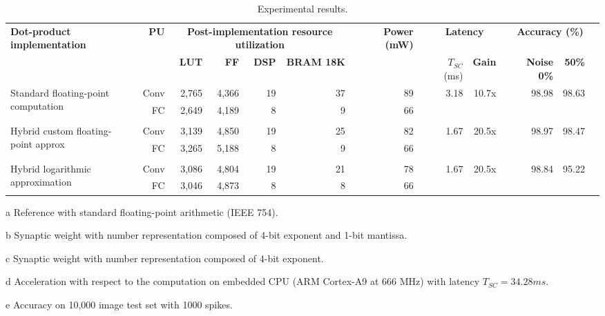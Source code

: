 \begin{table}[!t]
	\begin{threeparttable}
		\centering
		\caption{Experimental results.}\label{tab:results}
		\scriptsize
		\begin{tabular}{lrrrrrrrrrrrrrr}\toprule
			\multirow{2}{*}{\textbf{Dot-product implementation}} &\multirow{2}{*}{\textbf{PU}} &\multicolumn{4}{c}{\textbf{Post-implementation resource utilization}} & &\multirow{2}{*}{\textbf{Power (mW)}} & &\multicolumn{2}{c}{\textbf{Latency}} & &\multicolumn{2}{c}{\textbf{Accuracy (\%)\tnote{e}}} \\\cmidrule{3-6}\cmidrule{10-11}\cmidrule{13-14}
			& &\textbf{LUT} &\textbf{FF} &\textbf{DSP} &\textbf{BRAM 18K} & & & &$T_{SC}$ (ms) &\textbf{Gain\tnote{d}} & &\textbf{Noise 0\%} &\textbf{50\%} \\\midrule
			\multirow{2}{*}{Standard floating-point computation\tnote{a}} &Conv &2,765 &4,366 &19 &37 & &89 & &\multirow{2}{*}{3.18} &\multirow{2}{*}{10.7x} & &\multirow{2}{*}{98.98} &\multirow{2}{*}{98.63} \\
			&FC &2,649 &4,189 &8 &9 & &66 & & & & & & \\
			& & & & & & & & & & & & & \\
			\multirow{2}{*}{Hybrid custom floating-point approx\tnote{b}} &Conv &3,139 &4,850 &19 &25 & &82 & &\multirow{2}{*}{1.67} &\multirow{2}{*}{20.5x} & &\multirow{2}{*}{98.97} &\multirow{2}{*}{98.47} \\
			&FC &3,265 &5,188 &8 &9 & &66 & & & & & & \\
			& & & & & & & & & & & & & \\
			\multirow{2}{*}{Hybrid logarithmic approximation\tnote{c}} &Conv &3,086 &4,804 &19 &21 & &78 & &\multirow{2}{*}{1.67} &\multirow{2}{*}{20.5x} & &\multirow{2}{*}{98.84} &\multirow{2}{*}{95.22} \\
			&FC &3,046 &4,873 &8 &8 & &66 & & & & & & \\
			\bottomrule
		\end{tabular}
		\begin{tablenotes}
			\scriptsize
			\item[a] Reference with standard floating-point arithmetic (IEEE 754).
			\item[b] Synaptic weight with number representation composed of 4-bit exponent and 1-bit mantissa.
			\item[c] Synaptic weight with number representation composed of 4-bit exponent.
			\item[d] Acceleration with respect to the computation on embedded CPU (ARM Cortex-A9 at 666 MHz) with latency $T_{SC} = 34.28 ms$.
			\item[e] Accuracy on 10,000 image test set with 1000 spikes.
		\end{tablenotes}
	\end{threeparttable}
\end{table}